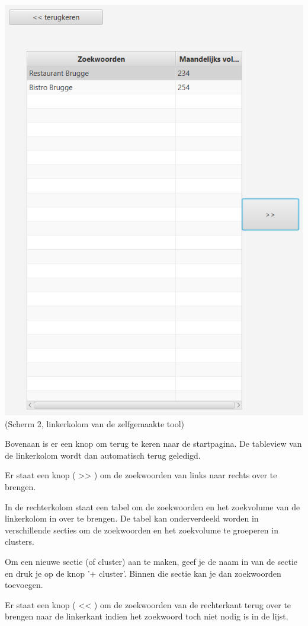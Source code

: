 \includegraphics[width=\linewidth]{Bachelorproef/bachelor/img/scherm2linkerkant.PNG}
(Scherm 2, linkerkolom van de zelfgemaakte tool)

Bovenaan is er een knop om terug te keren naar de startpagina. De tableview van de linkerkolom wordt dan automatisch terug geledigd. 

Er staat een knop ( >> ) om de zoekwoorden van links naar rechts over te brengen. 

In de rechterkolom staat een tabel om de zoekwoorden en het zoekvolume van de linkerkolom in over te brengen. De tabel kan onderverdeeld worden in verschillende secties om de zoekwoorden en het zoekvolume te groeperen in clusters. 

Om een nieuwe sectie (of cluster) aan te maken, geef je de naam in van de sectie en druk je op de knop '+ cluster'. Binnen die sectie kan je dan zoekwoorden toevoegen.

Er staat een knop ( << ) om de zoekwoorden van de rechterkant terug over te brengen naar de linkerkant indien het zoekwoord toch niet nodig is in de lijst. 

